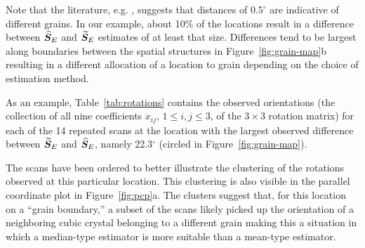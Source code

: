 %
Note that the literature, e.g. \cite{bingham10b}, suggests that distances of $0.5^\circ$ are indicative of different grains. In our example, about 10\% of the locations result in a difference between ${\widehat{\bm S}_E}$ and ${\widetilde{\bm S}_E}$ estimates of at least that size. Differences tend to be largest along boundaries between the spatial structures in Figure~\ref{fig:grain-map}b resulting in a different allocation of a location to  grain depending on the choice of estimation method.

As an example, Table~\ref{tab:rotations} contains the observed orientations (the collection of all nine coefficients $x_{ij}$, $1 \le i,j \le 3$, of the $3\times 3$ rotation matrix) for each of the 14 repeated scans at the location with the largest observed difference between ${\widetilde{\bm S}_E}$ and ${\widehat{\bm S}_E}$, namely 22.3$^\circ$ (circled in Figure~\ref{fig:grain-map}). 
  

The scans have been ordered to better illustrate  the clustering of the rotations observed at this particular location. This clustering is also visible in the parallel coordinate plot in Figure~\ref{fig:pcp}a. The clusters suggest that, for this location on a ``grain boundary,'' a subset of the scans likely picked up the orientation of a neighboring cubic crystal  belonging to a different grain making this a situation in which a median-type estimator is more suitable than a mean-type estimator.  

